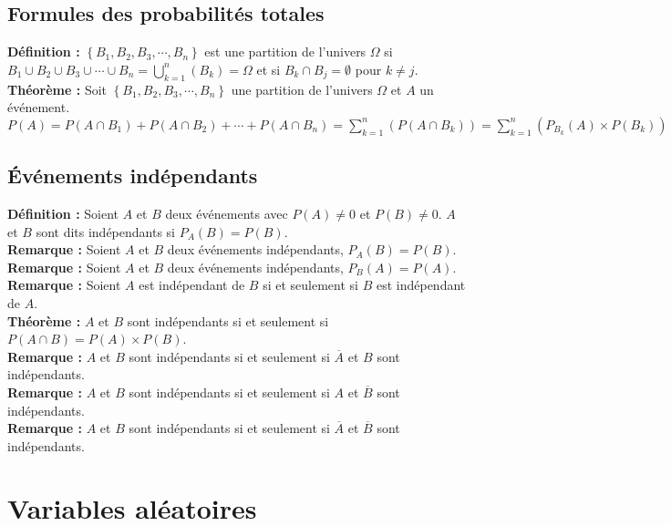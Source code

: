 \documentclass[a4paper,titlepage]{article}
\let\oldsection\section
\renewcommand\section{\clearpage\oldsection}
\begin{document}
    \subsection{Formules des probabilités totales}
        \textbf{Définition :} $\left\{B_{1},B_{2},B_{3},\cdots,B_{n}\right\}$ est une partition de l’univers $\varOmega$ si $B_{1}\cup B_{2}\cup B_{3}\cup\cdots\cup B_{n}=\bigcup\limits_{k=1}^{n}\left(B_{k}\right)=\varOmega$ et si $B_{k}\cap B_{j}=\emptyset$ pour $k\neq j$.
        \\
        \textbf{Théorème :} Soit $\left\{B_{1},B_{2},B_{3},\cdots,B_{n}\right\}$ une partition de l’univers $\varOmega$ et $A$ un événement.\linebreak $P\left(A\right)=P\left(A\cap B_{1}\right)+P\left(A\cap B_{2}\right)+\cdots+P\left(A\cap B_{n}\right)=\sum\limits_{k=1}^{n}\left(P\left(A\cap B_{k}\right)\right)=\sum\limits_{k=1}^{n}\left(P_{B_{k}}\left(A\right)\times P\left( B_{k}\right)\right)$
    \subsection{Événements indépendants}
        \textbf{Définition :} Soient $A$ et $B$ deux événements avec $P\left(A\right)\neq0$ et $P\left(B\right)\neq0$. $A$ et $B$ sont dits indépendants si $P_{A}\left(B\right)=P\left(B\right)$.
        \\
        \textbf{Remarque :} Soient $A$ et $B$ deux événements indépendants, $P_{A}\left(B\right)=P\left(B\right)$.
        \\
        \textbf{Remarque :} Soient $A$ et $B$ deux événements indépendants, $P_{B}\left(A\right)=P\left(A\right)$.
        \\
        \textbf{Remarque :} Soient $A$ est indépendant de $B$ si et seulement si $B$ est indépendant de $A$.
        \\
        \textbf{Théorème :} $A$ et $B$ sont indépendants si et seulement si $P\left(A\cap B\right)=P\left(A\right)\times P\left(B\right)$.
        \\
        \textbf{Remarque :} $A$ et $B$ sont indépendants si et seulement si $\overline{A}$ et $B$ sont indépendants.
        \\
        \textbf{Remarque :} $A$ et $B$ sont indépendants si et seulement si $A$ et $\overline{B}$ sont indépendants.
        \\
        \textbf{Remarque :} $A$ et $B$ sont indépendants si et seulement si $\overline{A}$ et $\overline{B}$ sont indépendants.
\section{Variables aléatoires}
\end{document}

